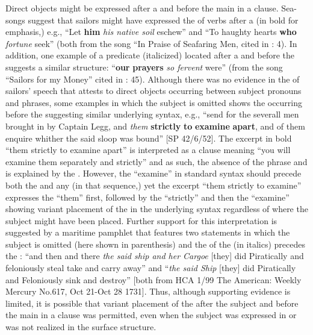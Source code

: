Direct objects might be expressed after a  and before the main  in a clause. Sea-songs suggest that sailors might have expressed the  of  verbs after a  (in bold for emphasis,) e.g., “Let \textbf{him} \textit{his native soil} eschew” and “To haughty hearts \textbf{who} \textit{fortune} seek” (both from the song “In Praise of Seafaring Men, cited in \citealt{Palmer1986}: 4). In addition, one example of a predicate  (italicized) located after a  and before the  suggests a similar structure: “\textbf{our} \textbf{prayers} \textit{so fervent} were” (from the song “Sailors for my Money” cited in \citealt{Palmer1986}: 45). Although there was no evidence in the  of sailors’ speech that attests to direct objects occurring between subject pronouns and  phrases, some examples in which the subject is omitted shows the  occurring before the  suggesting similar underlying syntax, e.g., “send for the severall men brought in by Captain Legg, and \textit{them} \textbf{strictly} \textbf{to} \textbf{examine} \textbf{apart}, and of them enquire whither the said sloop was bound” [SP 42/6/52]. The excerpt in bold “them strictly to examine apart” is interpreted as a clause meaning “you will examine them separately and strictly” and as such, the absence of the  phrase and  is explained by the . However, the  “examine” in standard syntax should precede both the  and any  (in that sequence,) yet the excerpt “them strictly to examine” expresses the  “them” first, followed by the  “strictly” and then the  “examine” showing variant placement of the  in the underlying syntax regardless of where the  subject might have been placed. Further support for this interpretation is suggested by a maritime pamphlet that features two statements in which the subject is omitted (here shown in parenthesis) and the  of the  (in italics) precedes the : “and then and there \textit{the said ship and her Cargoe} [they] did Piratically and feloniously steal take and carry away” and “\textit{the said Ship} [they] did Piratically and Feloniously sink and destroy” [both from HCA 1/99 The American: Weekly Mercury No.617, Oct 21-Oct 28 1731]. Thus, although supporting evidence is limited, it is possible that variant placement of the  after the subject and before the main  in a clause was permitted, even when the subject was expressed in  or was not realized in the surface structure. 

